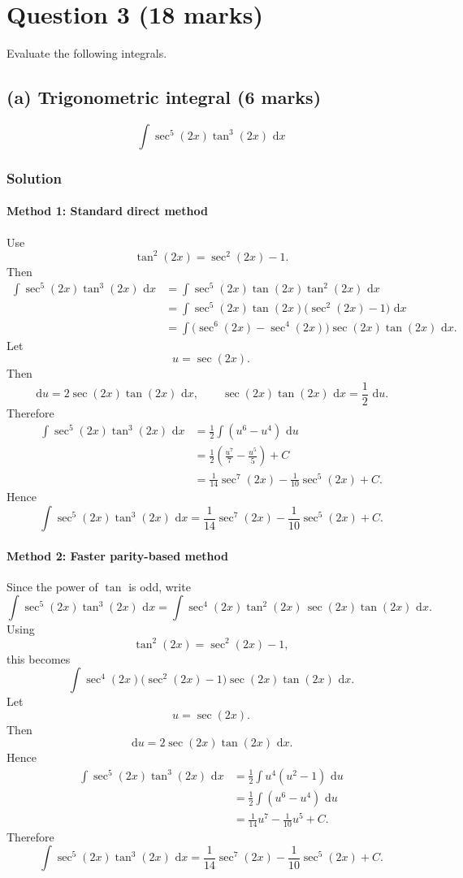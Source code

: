 \documentclass[12pt]{article}
\newcommand{\dd}{\,\mathrm{d}}
\begin{document}
\newpage
\section[Question 3 (18 marks)]{Question 3 \hfill (18 marks)}

Evaluate the following integrals.

\subsection{(a) Trigonometric integral \hfill (6 marks)}

\[
\int \sec^5(2x)\tan^3(2x)\,\dd x
\]

\bigskip
\subsubsection{Solution}

\paragraph{Method 1: Standard direct method}
Use
\[
\tan^2(2x)=\sec^2(2x)-1.
\]
Then
\begin{align*}
\int \sec^5(2x)\tan^3(2x)\,\dd x
&=\int \sec^5(2x)\tan(2x)\tan^2(2x)\,\dd x \\
&=\int \sec^5(2x)\tan(2x)\bigl(\sec^2(2x)-1\bigr)\,\dd x \\
&=\int \bigl(\sec^6(2x)-\sec^4(2x)\bigr)\sec(2x)\tan(2x)\,\dd x.
\end{align*}
Let
\[
u=\sec(2x).
\]
Then
\[
\dd u=2\sec(2x)\tan(2x)\,\dd x,
\qquad
\sec(2x)\tan(2x)\,\dd x=\frac12\,\dd u.
\]
Therefore
\begin{align*}
\int \sec^5(2x)\tan^3(2x)\,\dd x
&=\frac12\int (u^6-u^4)\,\dd u \\
&=\frac12\left(\frac{u^7}{7}-\frac{u^5}{5}\right)+C \\
&=\frac{1}{14}\sec^7(2x)-\frac{1}{10}\sec^5(2x)+C.
\end{align*}
Hence
\[
\boxed{
\int \sec^5(2x)\tan^3(2x)\,\dd x
=\frac{1}{14}\sec^7(2x)-\frac{1}{10}\sec^5(2x)+C.
}
\]

\newpage
\paragraph{Method 2: Faster parity-based method}

Since the power of \(\tan\) is odd, write
\[
\int \sec^5(2x)\tan^3(2x)\,\dd x
=\int \sec^4(2x)\tan^2(2x)\,\sec(2x)\tan(2x)\,\dd x.
\]
Using
\[
\tan^2(2x)=\sec^2(2x)-1,
\]
this becomes
\[
\int \sec^4(2x)\bigl(\sec^2(2x)-1\bigr)\sec(2x)\tan(2x)\,\dd x.
\]
Let
\[
u=\sec(2x).
\]
Then
\[
\dd u=2\sec(2x)\tan(2x)\,\dd x.
\]
Hence
\begin{align*}
\int \sec^5(2x)\tan^3(2x)\,\dd x
&=\frac12\int u^4(u^2-1)\,\dd u \\
&=\frac12\int (u^6-u^4)\,\dd u \\
&=\frac{1}{14}u^7-\frac{1}{10}u^5+C.
\end{align*}
Therefore
\[
\boxed{
\int \sec^5(2x)\tan^3(2x)\,\dd x
=\frac{1}{14}\sec^7(2x)-\frac{1}{10}\sec^5(2x)+C.
}
\]
\end{document}
